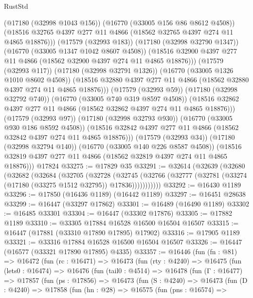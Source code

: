 \begin{lexlean}{RustStd}
\begin{coremodule}
{\begin{coremodule}
{{{{{{{{{{{{{{{{{{{{{{{{{{{{{{{{{{{{{{{{{{{{{{{{{{{{{{{                (@17180 (@32998 @1043 @156))
                (@16770 (@33005 @156 @86 @8612 @4508))
                (@18516 @32765 @4397 @277 @11 @4866 (@18562 @32765 @4397 @274 @11 @4865 @18876)))
              (@17579 (@32993 @183))
              (@17180 (@32998 @32790 @1347))
              (@16770 (@33005 @1347 @1042 @8607 @4508))
              (@18516 @32900 @4397 @277 @11 @4866 (@18562 @32900 @4397 @274 @11 @4865 @18876)))
            (@17579 (@32993 @117))
            (@17180 (@32998 @32791 @1326))
            (@16770 (@33005 @1326 @1010 @8602 @4508))
            (@18516 @32880 @4397 @277 @11 @4866 (@18562 @32880 @4397 @274 @11 @4865 @18876)))
          (@17579 (@32993 @59))
          (@17180 (@32998 @32792 @740))
          (@16770 (@33005 @740 @319 @8597 @4508))
          (@18516 @32862 @4397 @277 @11 @4866 (@18562 @32862 @4397 @274 @11 @4865 @18876)))
        (@17579 (@32993 @97))
        (@17180 (@32998 @32793 @930))
        (@16770 (@33005 @930 @186 @8592 @4508))
        (@18516 @32842 @4397 @277 @11 @4866 (@18562 @32842 @4397 @274 @11 @4865 @18876)))
      (@17579 (@32993 @34))
      (@17180 (@32998 @32794 @140))
      (@16770 (@33005 @140 @226 @8587 @4508))
      (@18516 @32819 @4397 @277 @11 @4866 (@18562 @32819 @4397 @274 @11 @4865 @18876)))
    @17824
@33275 := @17829 @35
@33291 := @32614
    (@32639
      (@32680
        (@32682
          (@32684
            (@32705
              (@32728
                (@32745
                  (@32766 (@32777 (@32781 (@33274 (@17180 (@33275 @1512 @32795)) @17836)))))))))))
@33292 := @16430 @1189
@33296 := @17850 (@16436 @1189) (@16442 @1189)
@33297 := @16451 @28638
@33299 := @16447 (@33297 @17862)
@33301 := @16489 (@16490 @1189)
@33302 := @16485 @33301
@33304 := @16447 (@33302 @17876)
@33305 := @17882 @1189
@33310 := @33305 @17884 @16528 @16500 @16504 @16507
@33315 := @16447 (@17881 (@33310 @17890 @17895) @17902)
@33316 := @17905 @1189
@33321 := @33316 @17884 @16528 @16500 @16504 @16507
@33326 := @16447 (@16577 (@33321 @17890 @17895) @4335)
@33357 := @16446
    (fun (fn : @81) =>
    @16472
      (fun (rc : @16471) =>
      @16473
        (fun (rty : @4240) =>
        @16475
          (fun (lets0 : @16474) =>
          @16476
            (fun (tail0 : @4514) =>
            @16478
              (fun (Γ : @16477) =>
              @17857
                (fun (ps : @17856) =>
                @16473
                  (fun (S : @4240) =>
                  @16473
                    (fun (D : @4240) =>
                    @17858
                      (fun (hn : @28) =>
                      @16575
                        (fun (pns : @16574) =>
}}}}}}}}}}}}}}}}}}}}}}}}}}}}}}}}}}}}}}}}}}}}}}}}}}}}}}}
\end{coremodule}}
\end{coremodule}
\end{lexlean}
